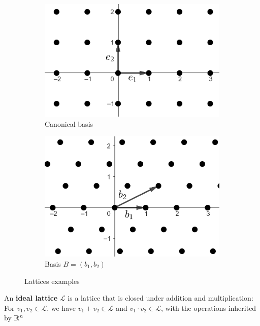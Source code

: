 \begin{figure}[!htb]
\centering
\begin{subfigure}{.5\textwidth}
  \centering
  \includegraphics[scale=0.25]{files/figures/lattice_canonical.png}
  \caption{Canonical basis}
  \label{fig:canonical_lattice}
\end{subfigure}%
\begin{subfigure}{.5\textwidth}
  \centering
  \includegraphics[scale=0.25]{files/figures/lattice2.png}
  \caption{Basis $B=(b_1,b_2)$}
  \label{fig:sub2}
\end{subfigure}
\caption{Lattices examples}
\label{fig:lattices}
\end{figure}

\begin{definition}
An \textbf{ideal lattice} $\mathcal L$ is a lattice that is closed under addition and multiplication: For $v_1,v_2\in \mathcal{L}$, we have $v_1+v_2\in \mathcal{L}$ and $v_1\cdot v_2\in\mathcal L$, with the operations inherited by $\mathbb{R}^n$
\end{definition} 

